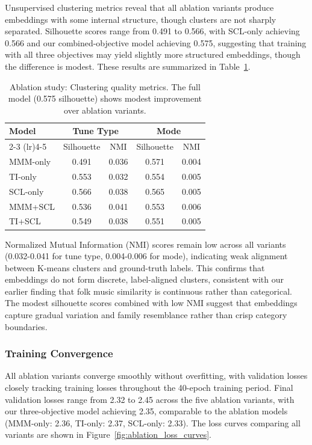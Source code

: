\documentclass[]{interact}
\theoremstyle{plain}
\theoremstyle{definition}
\theoremstyle{remark}
\begin{document}
Unsupervised clustering metrics reveal that all ablation variants produce embeddings with some internal structure, though clusters are not sharply separated. Silhouette scores range from 0.491 to 0.566, with SCL-only achieving 0.566 and our combined-objective model achieving 0.575, suggesting that training with all three objectives may yield slightly more structured embeddings, though the difference is modest. These results are summarized in Table~\ref{tab:ablation_clustering}.

\begin{table}[H]
\centering
\caption{Ablation study: Clustering quality metrics. The full model (0.575 silhouette) shows modest improvement over ablation variants.}
\label{tab:ablation_clustering}
\begin{tabular}{lcccc}
\toprule
\textbf{Model} & \multicolumn{2}{c}{\textbf{Tune Type}} & \multicolumn{2}{c}{\textbf{Mode}} \\
\cmidrule(lr){2-3} \cmidrule(lr){4-5}
 & Silhouette & NMI & Silhouette & NMI \\
\midrule
MMM-only & 0.491 & 0.036 & 0.571 & 0.004 \\
TI-only & 0.553 & 0.032 & 0.554 & 0.005 \\
SCL-only & 0.566 & 0.038 & 0.565 & 0.005 \\
MMM+SCL & 0.536 & 0.041 & 0.553 & 0.006 \\
TI+SCL & 0.549 & 0.038 & 0.551 & 0.005 \\
\bottomrule
\end{tabular}
\end{table}

Normalized Mutual Information (NMI) scores remain low across all variants (0.032-0.041 for tune type, 0.004-0.006 for mode), indicating weak alignment between K-means clusters and ground-truth labels. This confirms that embeddings do not form discrete, label-aligned clusters, consistent with our earlier finding that folk music similarity is continuous rather than categorical. The modest silhouette scores combined with low NMI suggest that embeddings capture gradual variation and family resemblance rather than crisp category boundaries.

\subsubsection{Training Convergence}

All ablation variants converge smoothly without overfitting, with validation losses closely tracking training losses throughout the 40-epoch training period. Final validation losses range from 2.32 to 2.45 across the five ablation variants, with our three-objective model achieving 2.35, comparable to the ablation models (MMM-only: 2.36, TI-only: 2.37, SCL-only: 2.33). The loss curves comparing all variants are shown in Figure~\ref{fig:ablation_loss_curves}.
\end{document}
